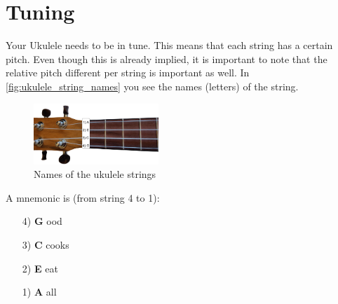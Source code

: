 \section{Tuning}

Your Ukulele needs to be in tune. This means that each string has a certain pitch. Even though this is already implied, it is important to note that the relative pitch different per string is important as well. In \autoref{fig:ukulele_string_names} you see the names (letters) of the string.

\begin{figure}[h]
    \centering
    \includegraphics[width=0.42\textwidth]{../../Images/UkuleleNeck-StringNames.png}
    \caption{Names of the ukulele strings}
    \label{fig:ukulele_string_names}
\end{figure}

A mnemonic is (from string 4 to 1):

\begin{itemize}
	\setlength\itemsep{0em}
	\item[4)] \textbf{G} ood
	\item[3)] \textbf{C} cooks
	\item[2)] \textbf{E} eat
	\item[1)] \textbf{A} all 
\end{itemize}


